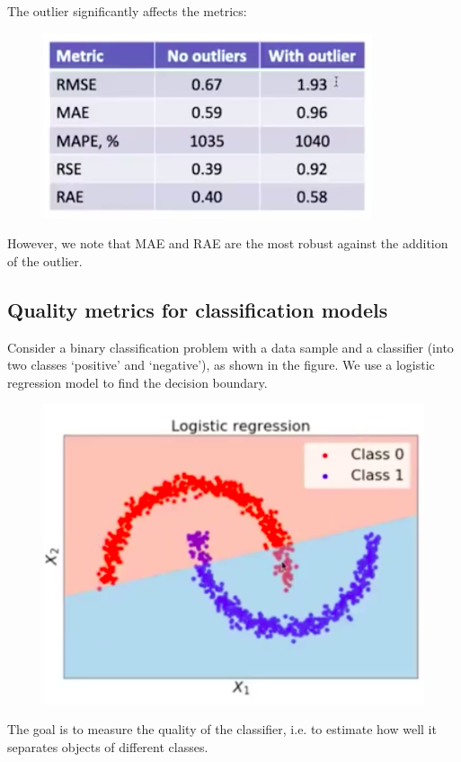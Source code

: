 \begin{frameex}
\newpage
The outlier significantly affects the metrics:
\begin{figure}[H]
\centering
\includegraphics[scale=0.4]{qualitycomparison4.png}
\end{figure}
However, we note that MAE and RAE are the most robust against the addition of the outlier.
\end{frameex}

\minirule

\subsection{Quality metrics for classification models}
Consider a binary classification problem with a data sample and a classifier (into two classes `positive' and `negative'), as shown in the figure. We use a logistic regression model to find the decision boundary.
\begin{figure}[H]
\centering
\includegraphics[scale=0.4]{classifierquality.png}
\end{figure}
The goal is to measure the quality of the classifier, i.e. to estimate how well it separates objects of different classes.\\

